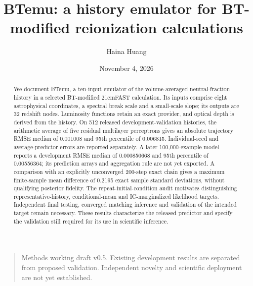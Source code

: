 \documentclass[reprint,superscriptaddress,nofootinbib,nobibnotes,amsmath,amssymb,aps,prd,floatfix,longbibliography]{revtex4-2}
\def\btemubody{paper/btemu_methods/body.tex}%
\def\btemubody{body.tex}%
\begin{document}
\title{BTemu: a history emulator for BT-modified reionization calculations}
\author{Haina Huang}
\date{November 4, 2026}
\begin{abstract}
We document BTemu, a ten-input emulator of the volume-averaged neutral-fraction history in a selected BT-modified 21cmFAST calculation. Its inputs comprise eight astrophysical coordinates, a spectral break scale and a small-scale slope; its outputs are 32 redshift nodes. Luminosity functions retain an exact provider, and optical depth is derived from the history. On 512 released development-validation histories, the arithmetic average of five residual multilayer perceptrons gives an absolute trajectory RMSE median of 0.001008 and 95th percentile of 0.006815. Individual-seed and average-predictor errors are reported separately. A later 100,000-example model reports a development RMSE median of 0.000850668 and 95th percentile of 0.00556364; its prediction arrays and aggregation rule are not yet exported. A comparison with an explicitly unconverged 200-step exact chain gives a maximum finite-sample mean difference of 0.2195 exact sample standard deviations, without qualifying posterior fidelity. The repeat-initial-condition audit motivates distinguishing representative-history, conditional-mean and IC-marginalized likelihood targets. Independent final testing, converged matching inference and validation of the intended target remain necessary. These results characterize the released predictor and specify the validation still required for its use in scientific inference.
\end{abstract}
\maketitle
\begin{quote}\small Methods working draft v0.5. Existing development results are separated from proposed validation. Independent novelty and scientific deployment are not yet established.\end{quote}

\end{document}
